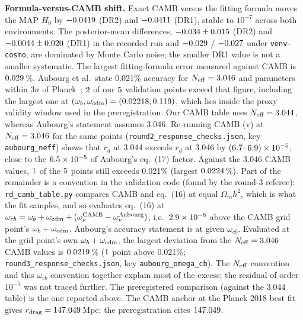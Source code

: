 \documentclass[11pt]{article}
\newcommand{\kms}{km\,s$^{-1}$\,Mpc$^{-1}$}
\begin{document}
\textbf{Formula-versus-CAMB shift.} Exact CAMB versus the fitting formula moves the MAP $H_0$ by $-0.0419$ (DR2) and $-0.0411$ (DR1), stable to $10^{-7}$
across both environments. The posterior-mean differences, $-0.034\pm0.015$ (DR2) and $-0.0044\pm0.020$ (DR1) in the recorded run and $-0.029$ / $-0.027$
under \texttt{venv-cosmo}, are dominated by Monte Carlo noise; the smaller DR1 value is not a smaller systematic. The largest fitting-formula error measured against CAMB is $0.029$\,\%.
Aubourg et al.\ state 0.021\% accuracy for $N_{\rm eff}=3.046$ and parameters within $3\sigma$ of Planck~\cite{aubourg2015}; $2$ of our
$5$ validation points exceed that figure, including the largest one at $(\omega_b,\omega_{\rm cdm})=(0.02218,0.119)$, which lies inside
the proxy validity window used in the preregistration. Our CAMB table uses $N_{\rm eff}=3.044$, whereas Aubourg's statement assumes 3.046. Re-running CAMB (v\raCambVer)
at $N_{\rm eff}=3.046$ for the same points (\texttt{round2\_response\_checks.json}, key \texttt{aubourg\_neff}) shows that $r_d$ at 3.044 exceeds $r_d$ at 3.046 by
$(6.7$--$6.9)\times10^{-5}$, close to the $6.5\times10^{-5}$ of Aubourg's eq.~(17) factor. Against the 3.046 CAMB values, $1$ of the $5$ points
still exceeds 0.021\% (largest $0.0224$\,\%). Part of the remainder is a convention in the validation code (found by the round-3 referee):
\texttt{rd\_camb\_table.py} compares CAMB and eq.~(16) at equal $\Omega_m h^2$, which is what the fit samples, and so evaluates eq.~(16) at
$\omega_{cb}=\omega_b+\omega_{\rm cdm}+(\omega_\nu^{\rm CAMB}-\omega_\nu^{\rm Aubourg})$, i.e.\ $2.9\times10^{-6}$ above the CAMB grid point's $\omega_b+\omega_{\rm cdm}$.
Aubourg's accuracy statement is at given $\omega_{cb}$. Evaluated at the grid point's own $\omega_b+\omega_{\rm cdm}$, the largest deviation from the $N_{\rm eff}=3.046$
CAMB values is $0.0219$\,\% ($1$ point above 0.021\%; \texttt{round3\_response\_checks.json}, key \texttt{aubourg\_omega\_cb}). The $N_{\rm eff}$ convention
and this $\omega_{cb}$ convention together explain most of the excess; the residual of order $10^{-5}$ was not traced further. The preregistered comparison (against the 3.044 table) is the one reported above.
The CAMB anchor at the Planck 2018 best fit gives $r_{\rm drag}=147.049$\,Mpc; the preregistration cites $147.049$.
\begin{table}[h]\centering\small\caption{BAO+BBN $H_0$ (\texttt{results/bao\_bbn\_h0/fit.json}, key \texttt{pulls}; recorded run, \texttt{venv-pta}). Values in \kms{} for $H_0$
and Mpc for $hr_d$. ``secondary'' is the preregistered fitting-formula analysis and is identical to the hash-locked first attempt in the same numerical environment. The
``shared'' gate rows are BAO-only reproductions. $^\ddagger$Environment-dependent: re-executing the frozen script under \texttt{venv-cosmo} gives $|\Delta H_0|=\rePTwoD$
(strict rule met); the boundary is within Monte Carlo resolution (Sec.~\ref{sec:env}).}\label{tab:h0}
\resizebox{\textwidth}{!}{}\end{table}
\end{document}
